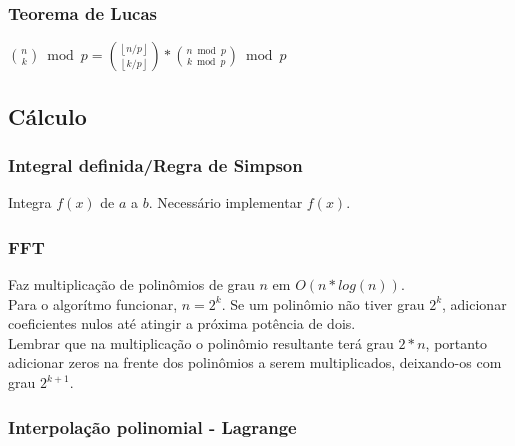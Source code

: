 \divisor

\subsubsection{Teorema de Lucas}

${n \choose k} \bmod{p} = {\left \lfloor{n/p}\right \rfloor \choose \left \lfloor{k/p}\right \rfloor} * {n \bmod{p} \choose k \bmod{p}} \bmod{p}$




\subsection{Cálculo}

\subsubsection{Integral definida/Regra de Simpson}
Integra $f(x)$ de $a$ a $b$. Necessário implementar $f(x)$.

\divisor

\subsubsection{FFT}
Faz multiplica\c{c}\~{a}o de polin\^{o}mios de grau $n$ em $O(n*log(n))$.\\
Para o algor\'{i}tmo funcionar, $n=2^k$. Se um polin\^{o}mio n\~{a}o tiver grau $2^k$, adicionar coeficientes nulos at\'{e} atingir a pr\'{o}xima pot\^{e}ncia de dois.\\
Lembrar que na multiplica\c{c}\~{a}o o polin\^{o}mio resultante ter\'{a} grau $2*n$, portanto adicionar zeros na frente dos polin\^{o}mios a serem multiplicados, deixando-os com grau $2^{k+1}$.

\divisor

\subsubsection{Interpola\c{c}\~{a}o polinomial - Lagrange}

